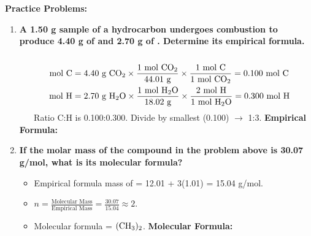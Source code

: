 \documentclass{article}
\begin{document}
\textbf{Practice Problems:}
\begin{enumerate}[itemsep=5pt]
    \item \textbf{A 1.50 g sample of a hydrocarbon undergoes combustion to produce 4.40 g of  and 2.70 g of . Determine its empirical formula.}
    \begin{align*}
        \text{mol C} &= 4.40 \text{ g } \ce{CO2} \times \frac{1 \text{ mol } \ce{CO2}}{44.01 \text{ g}} \times \frac{1 \text{ mol C}}{1 \text{ mol } \ce{CO2}} = 0.100 \text{ mol C} \\
        \text{mol H} &= 2.70 \text{ g } \ce{H2O} \times \frac{1 \text{ mol } \ce{H2O}}{18.02 \text{ g}} \times \frac{2 \text{ mol H}}{1 \text{ mol } \ce{H2O}} = 0.300 \text{ mol H}
    \end{align*}
    Ratio C:H is 0.100:0.300. Divide by smallest (0.100) $\rightarrow$ 1:3. \textbf{Empirical Formula: }
    
    \item \textbf{If the molar mass of the compound in the problem above is 30.07 g/mol, what is its molecular formula?}
    \begin{itemize}
        \item Empirical formula mass of  = 12.01 + 3(1.01) = 15.04 g/mol.
        \item $n = \frac{\text{Molecular Mass}}{\text{Empirical Mass}} = \frac{30.07}{15.04} \approx 2$.
        \item Molecular formula = $(\ce{CH3})_2$. \textbf{Molecular Formula: }
    \end{itemize}


\end{enumerate}
\end{document}
